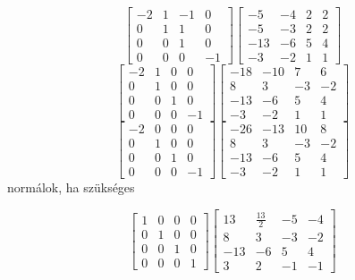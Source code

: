 \documentclass[12pt]{article}
\begin{document}
$$\left[{\begin{array}{cccc}-2& 1& -1& 0\\ 0& 1& 1& 0\\ 0& 0& 1& 0\\ 0& 0& 0& -1\end{array}}\right]\left[{\begin{array}{cccc}-5& -4& 2& 2\\ -5& -3& 2& 2\\ -13& -6& 5& 4\\ -3& -2& 1& 1\end{array}}\right]$$
$$\left[{\begin{array}{cccc}-2& 1& 0& 0\\ 0& 1& 0& 0\\ 0& 0& 1& 0\\ 0& 0& 0& -1\end{array}}\right]\left[{\begin{array}{cccc}-18& -10& 7& 6\\ 8& 3& -3& -2\\ -13& -6& 5& 4\\ -3& -2& 1& 1\end{array}}\right]$$
$$\left[{\begin{array}{cccc}-2& 0& 0& 0\\ 0& 1& 0& 0\\ 0& 0& 1& 0\\ 0& 0& 0& -1\end{array}}\right]\left[{\begin{array}{cccc}-26& -13& 10& 8\\ 8& 3& -3& -2\\ -13& -6& 5& 4\\ -3& -2& 1& 1\end{array}}\right]$$
normálok, ha szükséges

$$\left[{\begin{array}{cccc}1& 0& 0& 0\\ 0& 1& 0& 0\\ 0& 0& 1& 0\\ 0& 0& 0& 1\end{array}}\right]\left[{\begin{array}{cccc}13& \frac{13}{2}& -5& -4\\ 8& 3& -3& -2\\ -13& -6& 5& 4\\ 3& 2& -1& -1\end{array}}\right]$$
\end{document}
